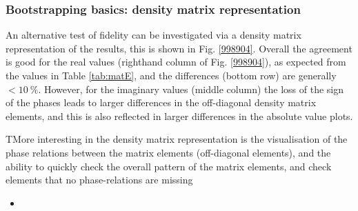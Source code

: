 \subsubsection{Bootstrapping basics: density matrix representation}

An alternative test of fidelity can be investigated via a density matrix representation of the results, this is shown in Fig. \ref{998904}. Overall the agreement is good for the real values (righthand column of Fig. \ref{998904}), as expected from the values in Table \ref{tab:matE}, and the differences (bottom row) are generally $<10~\%$. However, for the imaginary values (middle column) the loss of the sign of the phases leads to larger differences in the off-diagonal density matrix elements, and this is also reflected in larger differences in the absolute value plots.

TMore interesting in the density matrix representation is the visualisation of the phase relations between the matrix elements (off-diagonal elements), and the ability to quickly check the overall pattern of the matrix elements, and check elements that no phase-relations are missing


\begin{itemize}
\item 
\end{itemize}